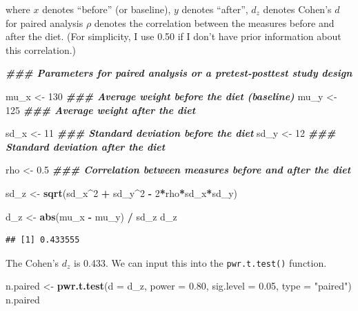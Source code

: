\documentclass[
]{book}
\newenvironment{Shaded}{\begin{snugshade}}{\end{snugshade}}
\newcommand{\AttributeTok}[1]{\textcolor[rgb]{0.13,0.29,0.53}{#1}}
\newcommand{\DecValTok}[1]{\textcolor[rgb]{0.00,0.00,0.81}{#1}}
\newcommand{\DocumentationTok}[1]{\textcolor[rgb]{0.56,0.35,0.01}{\textbf{\textit{#1}}}}
\newcommand{\FloatTok}[1]{\textcolor[rgb]{0.00,0.00,0.81}{#1}}
\newcommand{\FunctionTok}[1]{\textcolor[rgb]{0.13,0.29,0.53}{\textbf{#1}}}
\newcommand{\NormalTok}[1]{#1}
\newcommand{\OtherTok}[1]{\textcolor[rgb]{0.56,0.35,0.01}{#1}}
\newcommand{\SpecialCharTok}[1]{\textcolor[rgb]{0.81,0.36,0.00}{\textbf{#1}}}
\newcommand{\StringTok}[1]{\textcolor[rgb]{0.31,0.60,0.02}{#1}}
\begin{document}
where \(x\) denotes ``before'' (or baseline), \(y\) denotes ``after'', \(d_{z}\) denotes Cohen's \(d\) for paired analysis \(\rho\) denotes the correlation between the measures before and after the diet. (For simplicity, I use 0.50 if I don't have prior information about this correlation.)

\begin{Shaded}
\begin{Highlighting}[]
\DocumentationTok{\#\#\# Parameters for paired analysis or a pretest{-}posttest study design}

\NormalTok{mu\_x }\OtherTok{\textless{}{-}} \DecValTok{130}     \DocumentationTok{\#\#\# Average weight before the diet (baseline)}
\NormalTok{mu\_y }\OtherTok{\textless{}{-}} \DecValTok{125}     \DocumentationTok{\#\#\# Average weight after the diet}

\NormalTok{sd\_x }\OtherTok{\textless{}{-}} \DecValTok{11}      \DocumentationTok{\#\#\# Standard deviation before the diet}
\NormalTok{sd\_y }\OtherTok{\textless{}{-}} \DecValTok{12}      \DocumentationTok{\#\#\# Standard deviation after the diet}

\NormalTok{rho }\OtherTok{\textless{}{-}} \FloatTok{0.5}      \DocumentationTok{\#\#\# Correlation between measures before and after the diet}

\NormalTok{sd\_z }\OtherTok{\textless{}{-}} \FunctionTok{sqrt}\NormalTok{(sd\_x}\SpecialCharTok{\^{}}\DecValTok{2} \SpecialCharTok{+}\NormalTok{ sd\_y}\SpecialCharTok{\^{}}\DecValTok{2} \SpecialCharTok{{-}} \DecValTok{2}\SpecialCharTok{*}\NormalTok{rho}\SpecialCharTok{*}\NormalTok{sd\_x}\SpecialCharTok{*}\NormalTok{sd\_y)}
  
\NormalTok{d\_z }\OtherTok{\textless{}{-}} \FunctionTok{abs}\NormalTok{(mu\_x }\SpecialCharTok{{-}}\NormalTok{ mu\_y) }\SpecialCharTok{/}\NormalTok{ sd\_z}
\NormalTok{d\_z}
\end{Highlighting}
\end{Shaded}

\begin{verbatim}
## [1] 0.433555
\end{verbatim}

The Cohen's \(d_{z}\) is 0.433. We can input this into the \texttt{pwr.t.test()} function.

\begin{Shaded}
\begin{Highlighting}[]
\NormalTok{n.paired }\OtherTok{\textless{}{-}} \FunctionTok{pwr.t.test}\NormalTok{(}\AttributeTok{d =}\NormalTok{ d\_z, }\AttributeTok{power =} \FloatTok{0.80}\NormalTok{, }\AttributeTok{sig.level =} \FloatTok{0.05}\NormalTok{, }\AttributeTok{type =} \StringTok{"paired"}\NormalTok{)}
\NormalTok{n.paired}
\end{Highlighting}
\end{Shaded}
\end{document}
